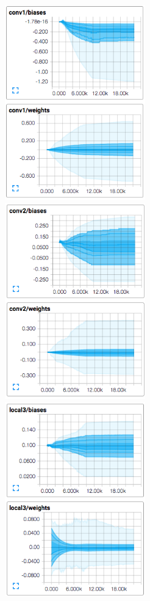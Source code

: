 \documentclass[11pt, twocolumn, twoside]{article}
\begin{document}
\begin{figure}
	\centering
	\includegraphics[width=2.4in]{conv1_params}
	\includegraphics[width=2.4in]{conv2_params}
	\includegraphics[width=2.4in]{local3_params}

\end{figure}
\end{document}
